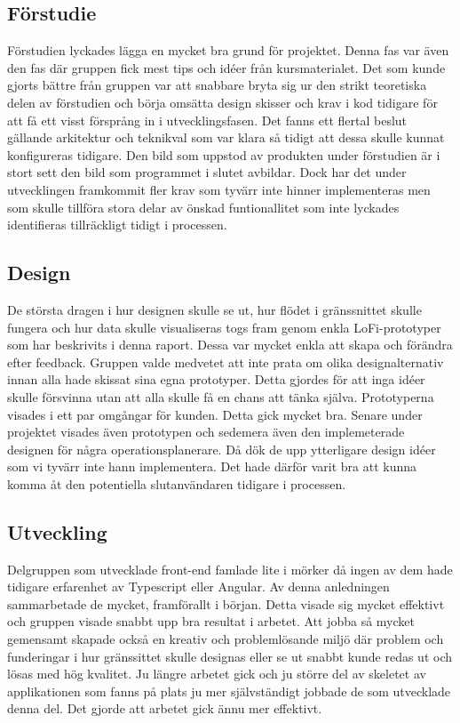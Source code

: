 \subsection{Förstudie}
Förstudien lyckades lägga en mycket bra grund för projektet. Denna fas var även den fas där gruppen fick mest tips och idéer från kursmaterialet. Det som kunde gjorts bättre från gruppen var att snabbare bryta sig ur den strikt teoretiska delen av förstudien och börja omsätta design skisser och krav i kod tidigare för att få ett visst försprång in i utvecklingsfasen. Det fanns ett flertal beslut gällande arkitektur och teknikval som var klara så tidigt att dessa skulle kunnat konfigureras tidigare. Den bild som uppstod av produkten under förstudien är i stort sett den bild som programmet i slutet avbildar. Dock har det under utvecklingen framkommit fler krav som tyvärr inte hinner implementeras men som skulle tillföra stora delar av önskad funtionallitet som inte lyckades identifieras tillräckligt tidigt i processen.

\subsection{Design}
De största dragen i hur designen skulle se ut, hur flödet i gränssnittet skulle fungera och hur data skulle visualiseras togs fram genom enkla LoFi-prototyper som har beskrivits i denna raport. Dessa var mycket enkla att skapa och förändra efter feedback. Gruppen valde medvetet att inte prata om olika designalternativ innan alla hade skissat sina egna prototyper. Detta gjordes för att inga idéer skulle försvinna utan att alla skulle få en chans att tänka själva. Prototyperna visades i ett par omgångar för kunden. Detta gick mycket bra. Senare under projektet visades även prototypen och sedemera även den implemeterade designen för några operationsplanerare. Då dök de upp ytterligare design idéer som vi tyvärr inte hann implementera. Det hade därför varit bra att kunna komma åt den potentiella slutanvändaren tidigare i processen.


\subsection{Utveckling}
Delgruppen som utvecklade front-end famlade lite i mörker då ingen av dem hade tidigare erfarenhet av Typescript eller Angular. Av denna anledningen sammarbetade de mycket, framförallt i början. Detta visade sig mycket effektivt och gruppen visade snabbt upp bra resultat i arbetet. Att jobba så mycket gemensamt skapade också en kreativ och problemlösande miljö där problem och funderingar i hur gränssittet skulle designas eller se ut snabbt kunde redas ut och lösas med hög kvalitet. Ju längre arbetet gick och ju större del av skeletet av applikationen som fanns på plats ju mer självständigt jobbade de som utvecklade denna del. Det gjorde att arbetet gick ännu mer effektivt.


